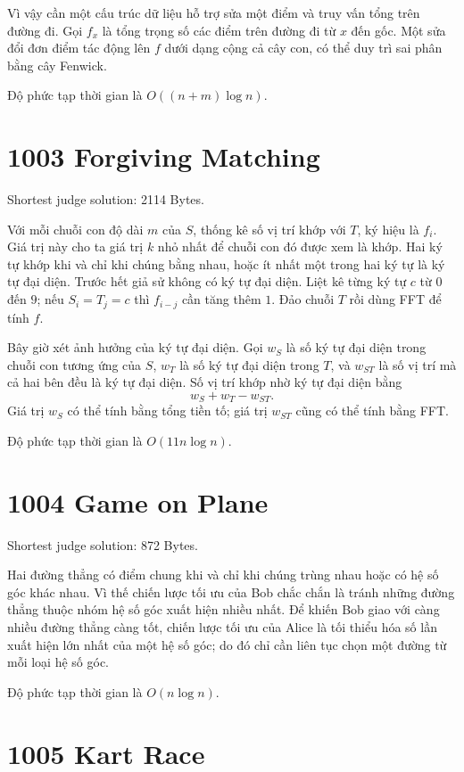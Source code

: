 \documentclass[11pt]{article}
\begin{document}
Vì vậy cần một cấu trúc dữ liệu hỗ trợ sửa một điểm và truy vấn tổng trên
đường đi. Gọi $f_x$ là tổng trọng số các điểm trên đường đi từ $x$ đến gốc.
Một sửa đổi đơn điểm tác động lên $f$ dưới dạng cộng cả cây con, có thể duy
trì sai phân bằng cây Fenwick.

Độ phức tạp thời gian là $O((n+m)\log n)$.

\section{1003 Forgiving Matching}

Shortest judge solution: 2114 Bytes.

Với mỗi chuỗi con độ dài $m$ của $S$, thống kê số vị trí khớp với $T$, ký
hiệu là $f_i$. Giá trị này cho ta giá trị $k$ nhỏ nhất để chuỗi con đó được
xem là khớp. Hai ký tự khớp khi và chỉ khi chúng bằng nhau, hoặc ít nhất một
trong hai ký tự là ký tự đại diện. Trước hết giả sử không có ký tự đại diện.
Liệt kê từng ký tự $c$ từ $0$ đến $9$; nếu $S_i=T_j=c$ thì $f_{i-j}$ cần
tăng thêm $1$. Đảo chuỗi $T$ rồi dùng FFT để tính $f$.

Bây giờ xét ảnh hưởng của ký tự đại diện. Gọi $w_S$ là số ký tự đại diện trong
chuỗi con tương ứng của $S$, $w_T$ là số ký tự đại diện trong $T$, và $w_{ST}$
là số vị trí mà cả hai bên đều là ký tự đại diện. Số vị trí khớp nhờ ký tự
đại diện bằng
\[
  w_S+w_T-w_{ST}.
\]
Giá trị $w_S$ có thể tính bằng tổng tiền tố; giá trị $w_{ST}$ cũng có thể
tính bằng FFT.

Độ phức tạp thời gian là $O(11n\log n)$.

\section{1004 Game on Plane}

Shortest judge solution: 872 Bytes.

Hai đường thẳng có điểm chung khi và chỉ khi chúng trùng nhau hoặc có hệ số
góc khác nhau. Vì thế chiến lược tối ưu của Bob chắc chắn là tránh những
đường thẳng thuộc nhóm hệ số góc xuất hiện nhiều nhất. Để khiến Bob giao với
càng nhiều đường thẳng càng tốt, chiến lược tối ưu của Alice là tối thiểu hóa
số lần xuất hiện lớn nhất của một hệ số góc; do đó chỉ cần liên tục chọn một
đường từ mỗi loại hệ số góc.

Độ phức tạp thời gian là $O(n\log n)$.

\section{1005 Kart Race}
\end{document}
